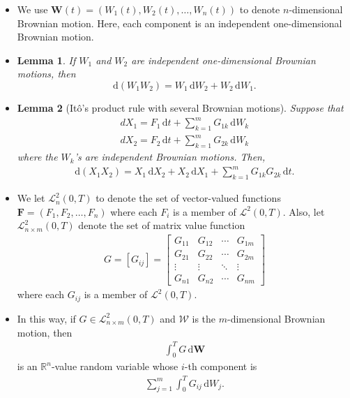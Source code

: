 \documentclass[10pt]{article}
\newtheorem{lemma}{Lemma}
\newcommand{\dee}{\mathrm{d}}
\newcommand{\ve}[1]{\mathbf{#1}}
\newcommand{\mcal}[1]{\mathcal{#1}}
\newcommand{\Real}{\mathbb{R}}
\begin{document}
\begin{itemize}
  \item We use $\ve{W}(t) = (W_1(t), W_2(t), \dotsc, W_n(t))$ to denote $n$-dimensional Brownian motion. Here, each component is an independent one-dimensional Brownian motion.
  
  \item \begin{lemma}
    If $W_1$ and $W_2$ are independent one-dimensional Brownian motions, then $$\dee(W_1 W_2) = W_1\, \dee W_2 + W_2\, \dee W_1.$$
  \end{lemma}

  \item \begin{lemma}[It\^{o}'s product rule with several Brownian motions]
    Suppose that
    \begin{align*}
      dX_1 = F_1\, \dee t + \sum_{k=1}^m G_{1k}\, \dee W_k \\
      dX_2 = F_2\, \dee t + \sum_{k=1}^m G_{2k}\, \dee W_k
    \end{align*}
    where the $W_k$'s are independent Brownian motions. Then,
    \begin{align*}
      \dee(X_1 X_2) = X_1\, \dee X_2 + X_2\, \dee X_1 + \sum_{k=1}^m G_{1k}G_{2k}\, \dee t.
    \end{align*}
  \end{lemma}

  \item We let $\mcal{L}^2_{n}(0,T)$ to denote the set of vector-valued functions $\ve{F} = (F_1, F_2, \dotsc, F_n)$ where each $F_i$ is a member of $\mcal{L}^2(0,T)$. Also, let $\mcal{L}^2_{n \times m}(0,T)$ denote the set of matrix value function
  \begin{align*}
    G = [G_{ij}] = \begin{bmatrix}
      G_{11} & G_{12} & \cdots & G_{1m} \\
      G_{21} & G_{22} & \cdots & G_{2m} \\
      \vdots & \vdots & \ddots & \vdots \\
      G_{n1} & G_{n2} & \cdots & G_{nm} 
    \end{bmatrix}    
  \end{align*}
  where each $G_{ij}$ is a member of $\mcal{L}^2(0,T)$.

  \item In this way, if $G \in \mcal{L}^2_{n\times m}(0,T)$ and $\mcal{W}$ is the $m$-dimensional Brownian motion, then
  \begin{align*}
    \int_0^T G\, \dee\ve{W}
  \end{align*}
  is an $\Real^n$-value random variable whose $i$-th component is
  \begin{align*} 
    \sum_{j=1}^m \int_0^T G_{ij}\, \dee W_j.
  \end{align*}


\end{itemize}
\end{document}
